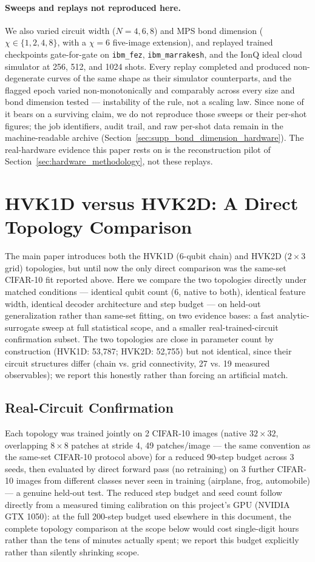 \documentclass[11pt]{article}
\begin{document}
\paragraph{Sweeps and replays not reproduced here.} We also varied circuit width ($N=4,6,8$) and MPS bond dimension ($\chi\in\{1,2,4,8\}$, with a $\chi=6$ five-image extension), and replayed trained checkpoints gate-for-gate on \texttt{ibm\_fez}, \texttt{ibm\_marrakesh}, and the IonQ ideal cloud simulator at 256, 512, and 1024 shots. Every replay completed and produced non-degenerate curves of the same shape as their simulator counterparts, and the flagged epoch varied non-monotonically and comparably across every size and bond dimension tested --- instability of the rule, not a scaling law. Since none of it bears on a surviving claim, we do not reproduce those sweeps or their per-shot figures; the job identifiers, audit trail, and raw per-shot data remain in the machine-readable archive (Section~\ref{sec:supp_bond_dimension_hardware}). The real-hardware evidence this paper rests on is the reconstruction pilot of Section~\ref{sec:hardware_methodology}, not these replays.
\section{HVK1D versus HVK2D: A Direct Topology Comparison}
\label{sec:topology_comparison}
The main paper introduces both the HVK1D (6-qubit chain) and HVK2D ($2\times3$ grid) topologies, but until now the only direct comparison was the same-set CIFAR-10 fit reported above. Here we compare the two topologies directly under matched conditions --- identical qubit count (6, native to both), identical feature width, identical decoder architecture and step budget --- on held-out generalization rather than same-set fitting, on two evidence bases: a fast analytic-surrogate sweep at full statistical scope, and a smaller real-trained-circuit confirmation subset. The two topologies are close in parameter count by construction (HVK1D: 53{,}787; HVK2D: 52{,}755) but not identical, since their circuit structures differ (chain vs. grid connectivity, 27 vs. 19 measured observables); we report this honestly rather than forcing an artificial match.

\subsection{Real-Circuit Confirmation}
\label{sec:topology_real_circuit}
Each topology was trained jointly on 2 CIFAR-10 images (native $32\times32$, overlapping $8\times8$ patches at stride 4, 49 patches/image --- the same convention as the same-set CIFAR-10 protocol above) for a reduced 90-step budget across 3 seeds, then evaluated by direct forward pass (no retraining) on 3 further CIFAR-10 images from different classes never seen in training (airplane, frog, automobile) --- a genuine held-out test. The reduced step budget and seed count follow directly from a measured timing calibration on this project's GPU (NVIDIA GTX 1050): at the full 200-step budget used elsewhere in this document, the complete topology comparison at the scope below would cost single-digit hours rather than the tens of minutes actually spent; we report this budget explicitly rather than silently shrinking scope.
\end{document}
